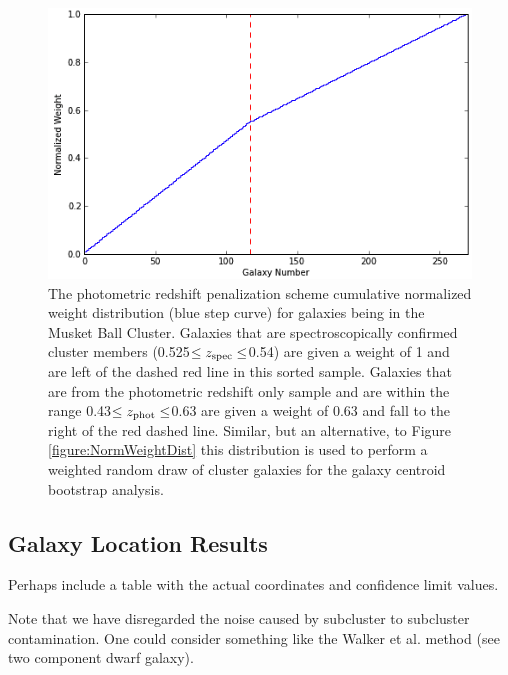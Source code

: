 \begin{figure}
\centering
\includegraphics[width=5in]{Chapter4/AnalysisFiles/cumnormwghtdist_zclip_photozpenalty.png}
\caption[Photometric redshift penalization scheme; cumulative normalized weight distribution for galaxies being in the Musket Ball Cluster.]{
The photometric redshift penalization scheme cumulative normalized weight distribution (blue step curve) for galaxies being in the Musket Ball Cluster. 
Galaxies that are spectroscopically confirmed cluster members (0.525$\leq z_{\rm spec} \leq$0.54) are given a weight of 1 and are left of the dashed red line in this sorted sample.
Galaxies that are from the photometric redshift only sample and are within the range 0.43$\leq z_{\rm phot} \leq$0.63 are given a weight of 0.63 and fall to the right of the red dashed line.
Similar, but an alternative, to Figure \ref{figure:NormWeightDist} this distribution is used to perform a weighted random draw of cluster galaxies for the galaxy centroid bootstrap analysis.
}
\label{figure:NormPenaltyWeightDist}
\end{figure}



\subsection{Galaxy Location Results}

Perhaps include a table with the actual coordinates and confidence limit values.

Note that we have disregarded the noise caused by subcluster to subcluster contamination. One could consider something like the Walker et al. method (see two component dwarf galaxy).


